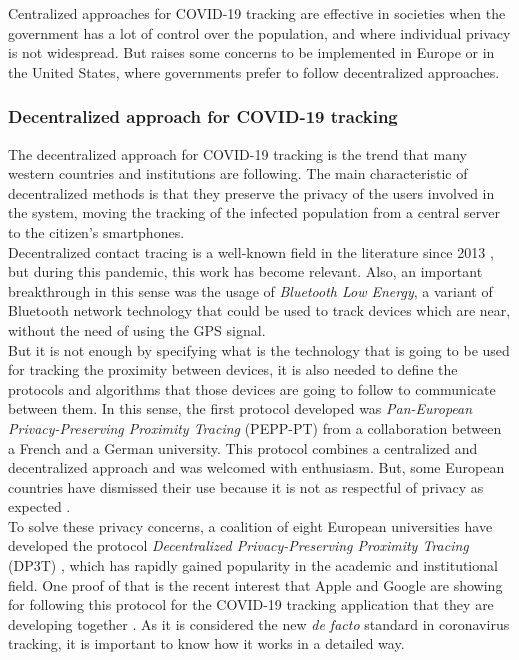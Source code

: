 \documentclass[a4paper, 12pt]{article}
\begin{document}
Centralized approaches for COVID-19 tracking are effective in societies when the government has a lot of control over the population, and where individual privacy is not widespread. But raises some concerns to be implemented in Europe or in the United States, where governments prefer to follow decentralized approaches.

\subsubsection{Decentralized approach for COVID-19 tracking}
\label{subsubsection:decentralized-approach}

The decentralized approach for COVID-19 tracking is the trend that many western countries and institutions are following. The main characteristic of decentralized methods is that they preserve the privacy of the users involved in the system, moving the tracking of the infected population from a central server to the citizen's smartphones. \\

Decentralized contact tracing is a well-known field in the literature since 2013 \cite{bell2020tracesecure}\cite{altuwaiyan2018epic}\cite{zhang2013privacy}, but during this pandemic, this work has become relevant. Also, an important breakthrough in this sense was the usage of \textit{Bluetooth Low Energy}, a variant of Bluetooth network technology that could be used to track devices which are near, without the need of using the GPS signal. \\

But it is not enough by specifying what is the technology that is going to be used for tracking the proximity between devices, it is also needed to define the protocols and algorithms that those devices are going to follow to communicate between them. In this sense, the first protocol developed was \textit{Pan-European Privacy-Preserving Proximity Tracing} (PEPP-PT) \cite{pepppt} from a collaboration between a French and a German university. This protocol combines a centralized and decentralized approach and was welcomed with enthusiasm. But, some European countries have dismissed their use because it is not as respectful of privacy as expected \cite{swiss-peppt}.\\

To solve these privacy concerns, a coalition of eight European universities have developed the protocol \textit{Decentralized Privacy-Preserving Proximity Tracing} (DP3T) \cite{dp3t-docs}, which has rapidly gained popularity in the academic and institutional field. One proof of that is the recent interest that Apple and Google are showing for following this protocol for the COVID-19 tracking application that they are developing together \cite{dp3t-google-apple}. As it is considered the new \textit{de facto} standard in coronavirus tracking, it is important to know how it works in a detailed way.\\
\end{document}
